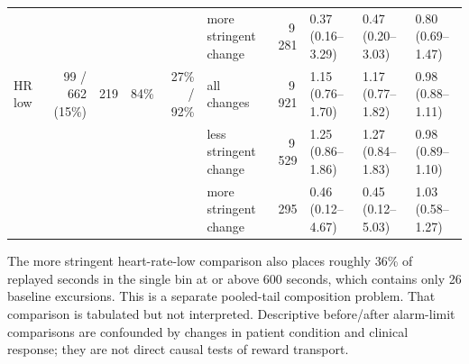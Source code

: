 \documentclass[11pt,letterpaper]{article}
\begin{document}
\begin{landscape}
\begin{table}[htbp]
\begin{tabular}{@{}lrrrrlrlll@{}}
 &  &  &  &  & more stringent change & 9\,281 & 0.37 (0.16--3.29) & 0.47 (0.20--3.03) & 0.80 (0.69--1.47) \\
\addlinespace
HR low & 99 / 662 (15\%) & 219 & 84\% & 27\% / 92\% & all changes & 9\,921 & 1.15 (0.76--1.70) & 1.17 (0.77--1.82) & 0.98 (0.88--1.11) \\
 &  &  &  &  & less stringent change & 9\,529 & 1.25 (0.86--1.86) & 1.27 (0.84--1.83) & 0.98 (0.89--1.10) \\
 &  &  &  &  & more stringent change & 295 & 0.46 (0.12--4.67) & 0.45 (0.12--5.03) & 1.03 (0.58--1.27) \\
\bottomrule
\end{tabular}
\end{table}\end{landscape}


The more stringent heart-rate-low comparison also places roughly 36\% of replayed seconds in the single bin at or above 600 seconds, which contains only 26 baseline excursions. This is a separate pooled-tail composition problem. That comparison is tabulated but not interpreted. Descriptive before/after alarm-limit comparisons are confounded by changes in patient condition and clinical response; they are not direct causal tests of reward transport.
\end{document}
